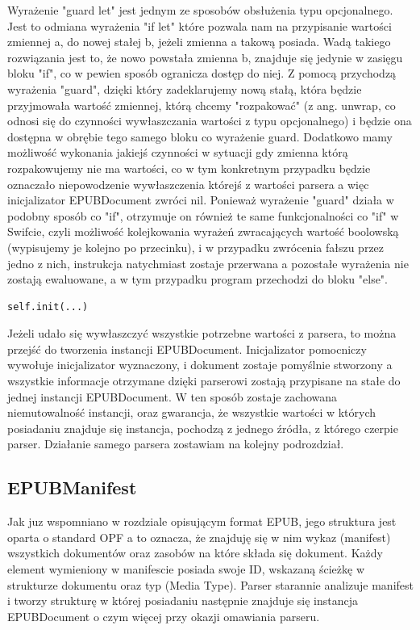 Wyrażenie "guard let" jest jednym ze sposobów obsłużenia typu opcjonalnego. Jest to odmiana wyrażenia "if let" które pozwala nam na przypisanie wartości zmiennej a, do nowej stałej b, jeżeli zmienna a takową posiada. Wadą takiego rozwiązania jest to, że nowo powstała zmienna b, znajduje się jedynie w zasięgu bloku "if", co w pewien sposób ogranicza dostęp do niej. Z pomocą przychodzą wyrażenia "guard", dzięki który zadeklarujemy nową stałą, która będzie przyjmowała wartość zmiennej, którą chcemy "rozpakować" (z ang. unwrap, co odnosi się do czynności wywłaszczania wartości z typu opcjonalnego) i będzie ona dostępna w obrębie tego samego bloku co wyrażenie guard. Dodatkowo mamy możliwość wykonania jakiejś czynności w sytuacji gdy zmienna którą rozpakowujemy nie ma wartości, co w tym konkretnym przypadku będzie oznaczało niepowodzenie wywłaszczenia którejś z wartości parsera a więc inicjalizator EPUBDocument zwróci nil. Ponieważ wyrażenie "guard" działa w podobny sposób co "if", otrzymuje on również te same funkcjonalności co "if" w Swifcie, czyli możliwość kolejkowania wyrażeń zwracających wartość boolowską (wypisujemy je kolejno po przecinku), i w przypadku zwrócenia fałszu przez jedno z nich, instrukcja natychmiast zostaje przerwana a pozostałe wyrażenia nie zostają ewaluowane, a w tym przypadku program przechodzi do bloku "else".

\begin{lstlisting}[language=swift-reference]
    self.init(...)
\end{lstlisting}

Jeżeli udało się wywłaszczyć wszystkie potrzebne wartości z parsera, to można przejść do tworzenia instancji EPUBDocument. Inicjalizator pomocniczy wywołuje inicjalizator wyznaczony, i dokument zostaje pomyślnie stworzony a wszystkie informacje otrzymane dzięki parserowi zostają przypisane na stałe do jednej instancji EPUBDocument. W ten sposób zostaje zachowana niemutowalność instancji, oraz gwarancja, że wszystkie wartości w których posiadaniu znajduje się instancja, pochodzą z jednego źródła, z którego czerpie parser. Działanie samego parsera zostawiam na kolejny podrozdział.

\subsection{EPUBManifest}

Jak juz wspomniano w rozdziale opisującym format EPUB, jego struktura jest oparta o standard OPF a to oznacza, że znajduję się w nim wykaz (manifest) wszystkich dokumentów oraz zasobów na które składa się dokument. Każdy element wymieniony w manifescie posiada swoje ID, wskazaną ścieżkę w strukturze dokumentu oraz typ (Media Type). Parser starannie analizuje manifest i tworzy strukturę w której posiadaniu następnie znajduje się instancja EPUBDocument o czym więcej przy okazji omawiania parseru.

